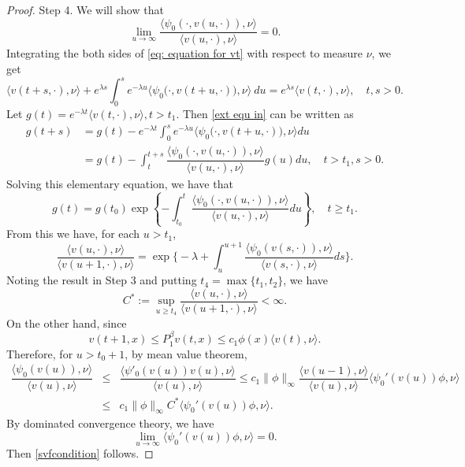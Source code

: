 \documentclass[12pt,a4paper]{amsart}
\theoremstyle{plain}
\theoremstyle{definition}
\numberwithin{equation}{section}
\begin{document}
\begin{proof}
	Step 4. We will show that
\begin{equation}
\label{svfcondition}
	\lim_{u\to \infty} \frac{ \langle\psi_0(\cdot, v(u,\cdot)),\nu\rangle}{\langle v(u,\cdot),\nu\rangle}
	=0.
\end{equation}
Integrating the both sides of \eqref{eq: equation for vt} with respect to measure $\nu$, we get
\begin{equation}\label{ext equ in}
	\langle v(t+s,\cdot), \nu\rangle + e^{\lambda s}\int_0^s e^{-\lambda u}\big\langle \psi_0\big(\cdot, v(t+u,\cdot)\big),\nu\big\rangle~du
	= e^{\lambda s}\langle v(t,\cdot),\nu \rangle,
	\quad t,s > 0.
\end{equation}  
	Let $g(t)=e^{-\lambda t}\langle v(t,\cdot),\nu\rangle, t>t_1$.
	Then
	\eqref{ext equ in} can be written as 
\begin{align}
	g(t+s)
	&=g(t)-e^{-\lambda t}\int_0^{s} e^{-\lambda u} \big\langle\psi_0\big(\cdot, v(t+u,\cdot)\big),\nu\big\rangle du
	\\&=g(t)-\int_t^{t+s}\dfrac{\langle\psi_0(\cdot, v(u,\cdot)),\nu\rangle}{\langle v(u,\cdot),\nu\rangle}g(u)du,
	\quad t>t_1, s>0.
\end{align}
	Solving this elementary equation, we have that
\[
	g(t)
	=g(t_0)\exp\left\{-\int_{t_0}^t\dfrac{\langle\psi_0(\cdot, v(u,\cdot)),\nu\rangle}{\langle v(u,\cdot),\nu\rangle}du\right\},
	\quad t\geq t_1.
\]
  	From this we have, for each $u>t_1$,
\[
	\frac{\langle v(u,\cdot),\nu\rangle}{\langle v(u+1,\cdot),\nu\rangle}=\exp\Big\{-\lambda+\int_{u}^{u+1}\dfrac{\langle \psi_0(v(s,\cdot)),\nu\rangle}{\langle v(s,\cdot),\nu\rangle}ds\Big\}.
\]
	Noting the result in Step 3 and putting $t_4=\max\{t_1,t_2\}$, we have
\[
	C^*:= \sup_{u\geq t_4} \frac{\langle v(u,\cdot),\nu\rangle}{\langle v(u+1,\cdot),\nu\rangle} < \infty.
\]
	On the other hand, since
\[
v(t+1,x)\leq P^{\beta}_1v(t,x)\leq c_1\phi(x)\langle v(t),\nu\rangle.
\]
Therefore, for $u>t_0+1$, by mean value theorem,
\begin{eqnarray*}
\dfrac{\langle\psi_0(v(u)),\nu\rangle}{\langle v(u),\nu\rangle}&\leq& \dfrac{\langle\psi'_0(v(u))v(u),\nu\rangle}{\langle v(u),\nu\rangle}
\leq c_1\|\phi\|_\infty\dfrac{\langle v(u-1),\nu\rangle}{\langle v(u),\nu\rangle}\langle\psi_0'(v(u))\phi,\nu\rangle\\
 &\leq& c_1\|\phi\|_\infty C^{*}\langle\psi_0'(v(u))\phi,\nu\rangle.
\end{eqnarray*}
By dominated convergence theory, we have
\[
\lim_{u\rightarrow\infty}\langle\psi_0'(v(u))\phi,\nu\rangle=0.
\]
Then \eqref{svfcondition} follows.


\end{proof}
\end{document}
